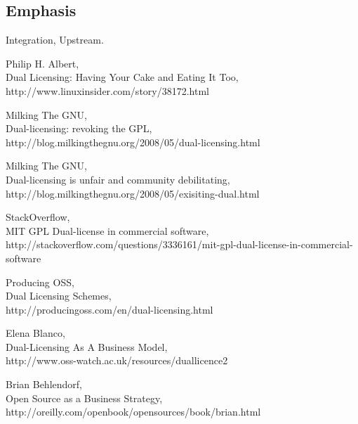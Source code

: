 \documentclass[11pt]{scrartcl}
\begin{document}

\subsection{Emphasis}
\label{sub:emphasis}

\par Integration, Upstream.


\begin{thebibliography}{9}

    Philip H. Albert,\\
    Dual Licensing: Having Your Cake and Eating It Too,\\
    http://www.linuxinsider.com/story/38172.html

    Milking The GNU,\\
    Dual-licensing: revoking the GPL,\\
    http://blog.milkingthegnu.org/2008/05/dual-licensing.html

    Milking The GNU,\\
    Dual-licensing is unfair and community debilitating,\\
    http://blog.milkingthegnu.org/2008/05/exisiting-dual.html

    StackOverflow,\\
    MIT GPL Dual-license in commercial software,\\
    http://stackoverflow.com/questions/3336161/mit-gpl-dual-license-in-commercial-software

    Producing OSS,\\
    Dual Licensing Schemes,\\
    http://producingoss.com/en/dual-licensing.html

    Elena Blanco,\\
    Dual-Licensing As A Business Model,\\
    http://www.oss-watch.ac.uk/resources/duallicence2

    Brian Behlendorf,\\
    Open Source as a Business Strategy,\\
    http://oreilly.com/openbook/opensources/book/brian.html
\end{thebibliography}
\end{document}
